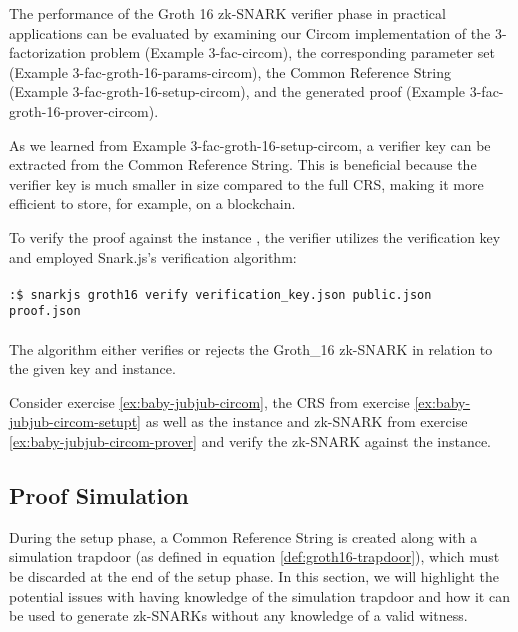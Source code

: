 \begin{example}
\label{ex:3-fac-groth-16-verifier-circom} The performance of the Groth 16 zk-SNARK verifier phase in practical applications can be evaluated by examining our Circom implementation of the 3-factorization problem (Example 3-fac-circom), the corresponding parameter set (Example 3-fac-groth-16-params-circom), the Common Reference String (Example 3-fac-groth-16-setup-circom), and the generated proof (Example 3-fac-groth-16-prover-circom).

As we learned from Example 3-fac-groth-16-setup-circom, a verifier key can be extracted from the Common Reference String. This is beneficial because the verifier key is much smaller in size compared to the full CRS, making it more efficient to store, for example, on a blockchain.

To verify the proof  against the instance , the verifier utilizes the verification key  and employed Snark.js's verification algorithm:
\\
\\
\texttt{:\$ snarkjs groth16 verify verification\_key.json public.json \\ proof.json}
\\
\\
The algorithm either verifies or rejects the Groth\_16 zk-SNARK in relation to the given key and instance.
\end{example} 

\begin{exercise} 
\label{ex:baby-jubjub-circom-verifier}
Consider exercise \ref{ex:baby-jubjub-circom}, the CRS from exercise \ref{ex:baby-jubjub-circom-setupt} as well as the instance and zk-SNARK from exercise \ref{ex:baby-jubjub-circom-prover} and verify the zk-SNARK against the instance.
\end{exercise}

\subsection{Proof Simulation}
\label{sec:proof_simulation} During the setup phase, a Common Reference String is created along with a simulation trapdoor (as defined in equation \eqref{def:groth16-trapdoor}), which must be discarded at the end of the setup phase. In this section, we will highlight the potential issues with having knowledge of the simulation trapdoor and how it can be used to generate zk-SNARKs without any knowledge of a valid witness.

